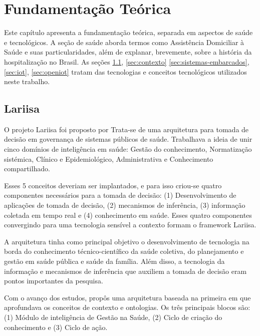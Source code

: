 \chapter{Fundamentação Teórica}\label{cap:fundamentacao-teorica}

Este capítulo apresenta a fundamentação teórica, separada em aspectos de saúde e
tecnológicos. A seção de saúde aborda termos como Assistência Domiciliar à
Saúde e suas particularidades, além de explanar, brevemente, sobre a história
da hospitalização no Brasil. As seções \ref{sec:lariisa}, \ref{sec:contexto}
\ref{sec:sistemas-embarcados}, \ref{sec:iot}, \ref{sec:openiot} tratam das
tecnologias e conceitos tecnológicos utilizados neste trabalho.

\section{Lariisa}\label{sec:lariisa}

O projeto Lariisa foi proposto por 
Trata-se de uma arquitetura para tomada de decisão em governança de sistemas
públicos de saúde. Trabalhava a ideia de unir cinco domínios de inteligência em
saúde: Gestão do conhecimento, Normatização sistémica,  Clínico e
Epidemiológico, Administrativa e Conhecimento compartilhado.

Esses 5 conceitos deveriam ser implantados, e para isso criou-se quatro
componentes necessários para a tomada de decisão: (1) Desenvolvimento de
aplicações de tomada de decisão, (2) mecanismos de inferência, (3) informação
coletada em tempo real e (4) conhecimento em saúde. Esses quatro componentes
convergindo para uma tecnologia sensível a contexto formam o framework Lariisa.


A arquitetura tinha como principal objetivo o desenvolvimento de tecnologia na
borda do conhecimento técnico-científico da saúde coletiva, do planejamento e
gestão em saúde pública e saúde da família. Além disso, a tecnologia da
informação e mecanismos de inferência que auxiliem a tomada de decisão eram
pontos importantes da pesquisa.

Com o avanço dos estudos,  propôs uma
arquitetura baseada na primeira em que aprofundava os conceitos de contexto e
ontologias. Os três principais blocos são: (1) Módulo de inteligência de Gestão
na Saúde, (2) Ciclo de criação do conhecimento e (3) Ciclo de ação.


